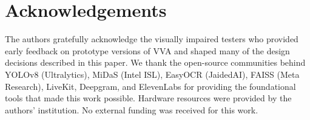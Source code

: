 \section*{Acknowledgements}

The authors gratefully acknowledge the visually impaired testers who provided early feedback on prototype versions of VVA and shaped many of the design decisions described in this paper. We thank the open-source communities behind YOLOv8 (Ultralytics), MiDaS (Intel ISL), EasyOCR (JaidedAI), FAISS (Meta Research), LiveKit, Deepgram, and ElevenLabs for providing the foundational tools that made this work possible. Hardware resources were provided by the authors' institution. No external funding was received for this work.
